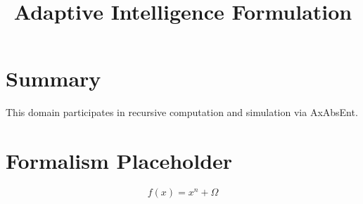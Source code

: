 \documentclass[12pt]{article}
\title{\textbf{Adaptive Intelligence Formulation}}
\begin{document}
\maketitle

\section*{Summary}
This domain participates in recursive computation and simulation via AxAbsEnt.

\section*{Formalism Placeholder}
\[
f(x) = x^n + \Omega
\]
\end{document}
